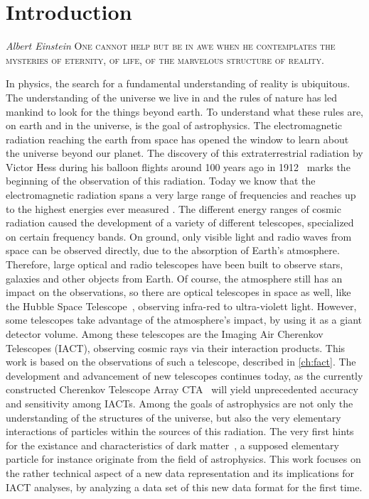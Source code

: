 \chapter{Introduction}
\nocite{biblatex, siunitx, Hunter:2007}%
%
\begin{aquote}{\textit{Albert Einstein}}
\textsc{One cannot help but be in awe when he contemplates the mysteries of eternity, of life, of the marvelous structure of reality.}
\end{aquote}
In physics, the search for a fundamental understanding of reality is ubiquitous. The understanding of the universe we live in and the rules of nature has
led mankind to look for the things beyond earth. To understand what these rules
are, on earth and in the universe, is the goal of astrophysics. The electromagnetic radiation reaching the earth from space has opened the window to learn
about the universe beyond our planet. The discovery of this extraterrestrial
radiation by Victor Hess during his balloon flights around \num{100} years ago in \num{1912}~\cite{Hess} marks the beginning of the observation of this radiation.
Today we know that the electromagnetic radiation spans a very large range of
frequencies and reaches up to the highest energies ever measured \cite{source}.
The different energy ranges of cosmic radiation caused the development of a
variety of different telescopes, specialized on certain frequency bands. On
ground, only visible light and radio waves from space can be observed directly,
due to the absorption of Earth's atmosphere. Therefore, large optical and radio
telescopes have been built to observe stars, galaxies and other objects from
Earth. Of course, the atmosphere still has an impact on the observations, so
there are optical telescopes in space as well, like the Hubble Space
Telescope~\cite{hubble}, observing infra-red to ultra-violett light. However,
some telescopes take advantage of the atmosphere's impact, by using it as a
giant detector volume. Among these telescopes are the Imaging Air Cherenkov
Telescopes (IACT), observing cosmic rays via their interaction products. This
work is based on the observations of such a telescope, described in
\autoref{ch:fact}. The development and advancement of new telescopes continues
today, as the currently constructed Cherenkov Telescope Array CTA~\cite{cta}
will yield unprecedented accuracy and sensitivity among IACTs.
Among the goals of astrophysics are not only the understanding of the
structures of the universe, but also the very elementary interactions of
particles within the sources of this radiation. The very first hints for the
existance and characteristics of dark matter~\cite{zwicky}, a supposed
elementary particle for instance originate from the field of astrophysics.
This work focuses on the rather technical aspect of a new data representation
and its implications for IACT analyses, by analyzing a data set of this new data
format for the first time.
